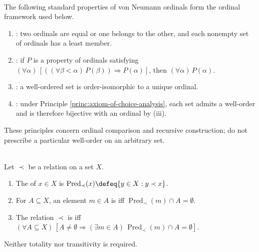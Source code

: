 \begin{principle} \label{princ:ordinal-foundations} \\
The following standard properties of von Neumann ordinals form the ordinal framework used below.
\begin{enumerate}[label=(\roman*)]
\setlength{\itemsep}{0pt}
\item {}: two ordinals are equal or one belongs to the other, and each nonempty set of ordinals has a least member.
\item {}: if $P$ is a property of ordinals satisfying $(\forall\alpha)\,[((\forall\beta<\alpha)\,P(\beta))\Rightarrow P(\alpha)]$, then $(\forall\alpha)\,P(\alpha)$.
\item {}: a well-ordered set is order-isomorphic to a unique ordinal.
\item {}: under Principle \ref{princ:axiom-of-choice-analysis}, each set admits a well-order and is therefore bijective with an ordinal by (iii).
\end{enumerate}
These principles concern ordinal comparison and recursive construction; do not prescribe a particular well-order on an arbitrary set.
\end{principle}

\begin{definition} \label{def:well-founded-relation} \\
Let $\prec$ be a relation on a set $X$.
\begin{enumerate}[label=(\roman*)]
\setlength{\itemsep}{0pt}
\item The  of $x\in X$ is $\operatorname{Pred}_{\prec}(x)\defeq\{y\in X:y\prec x\}$.
\item For $A\subseteq X$, an element $m\in A$ is  iff $\operatorname{Pred}_{\prec}(m)\cap A=\emptyset$.
\item The relation $\prec$ is  iff $(\forall A\subseteq X)\,[A\neq\emptyset\Rightarrow(\exists m\in A)\,\operatorname{Pred}_{\prec}(m)\cap A=\emptyset]$.
\end{enumerate}
Neither totality nor transitivity is required.
\end{definition}

